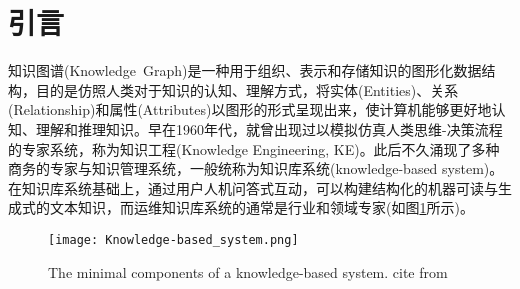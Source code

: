 \section{引言}
知识图谱\textrm{(Knowledge~Graph)}是一种用于组织、表示和存储知识的图形化数据结构，目的是仿照人类对于知识的认知、理解方式，将实体\textrm{(Entities)}、关系\textrm{(Relationship)}和属性\textrm{(Attributes)}以图形的形式呈现出来，使计算机能够更好地认知、理解和推理知识。早在1960年代，就曾出现过以模拟仿真人类思维-决策流程的专家系统，称为知识工程\textrm{(Knowledge Engineering, KE)}。此后不久涌现了多种商务的专家与知识管理系统，一般统称为知识库系统\textrm{(knowledge-based system)}。在知识库系统基础上，通过用户人机问答式互动，可以构建结构化的机器可读与生成式的文本知识，而运维知识库系统的通常是行业和领域专家(如图\ref{Fig:Knowledge-based_system}所示)。
\begin{figure}[h!]
\centering
\texttt{[image: Knowledge-based\_system.png]}
\caption{\small\textrm{The minimal components of a knowledge-based system. cite from\cite{ACR56-128_2023}}}%
\label{Fig:Knowledge-based_system}
\end{figure}


